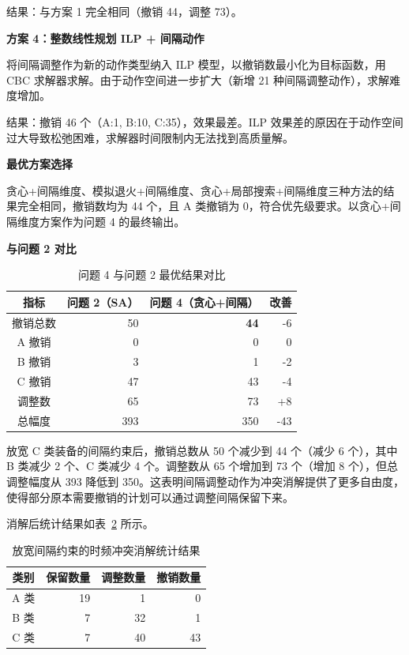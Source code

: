 结果：与方案 1 完全相同（撤销 44，调整 73）。

\textbf{方案 4：整数线性规划 ILP + 间隔动作}

将间隔调整作为新的动作类型纳入 ILP 模型，以撤销数最小化为目标函数，用 CBC 求解器求解。由于动作空间进一步扩大（新增 21 种间隔调整动作），求解难度增加。

结果：撤销 46 个（A:1, B:10, C:35），效果最差。ILP 效果差的原因在于动作空间过大导致松弛困难，求解器时间限制内无法找到高质量解。

\textbf{最优方案选择}

贪心+间隔维度、模拟退火+间隔维度、贪心+局部搜索+间隔维度三种方法的结果完全相同，撤销数均为 44 个，且 A 类撤销为 0，符合优先级要求。以贪心+间隔维度方案作为问题 4 的最终输出。

\textbf{与问题 2 对比}

\begin{table}[htbp]
\centering
\caption{问题 4 与问题 2 最优结果对比}
\label{tab:q4_vs_q2}
\begin{tabular}{crrr}
\toprule
指标 & 问题 2（SA） & 问题 4（贪心+间隔） & 改善 \\
\midrule
撤销总数 & 50 & \textbf{44} & -6 \\
A 撤销 & 0 & 0 & 0 \\
B 撤销 & 3 & 1 & -2 \\
C 撤销 & 47 & 43 & -4 \\
调整数 & 65 & 73 & +8 \\
总幅度 & 393 & 350 & -43 \\
\bottomrule
\end{tabular}
\end{table}

放宽 C 类装备的间隔约束后，撤销总数从 50 个减少到 44 个（减少 6 个），其中 B 类减少 2 个、C 类减少 4 个。调整数从 65 个增加到 73 个（增加 8 个），但总调整幅度从 393 降低到 350。这表明间隔调整动作为冲突消解提供了更多自由度，使得部分原本需要撤销的计划可以通过调整间隔保留下来。

消解后统计结果如表~\ref{tab:q4_result} 所示。

\begin{table}[htbp]
\centering
\caption{放宽间隔约束的时频冲突消解统计结果}
\label{tab:q4_result}
\begin{tabular}{crrr}
\toprule
类别 & 保留数量 & 调整数量 & 撤销数量 \\
\midrule
A 类 & 19 & 1 & 0 \\
B 类 & 7 & 32 & 1 \\
C 类 & 7 & 40 & 43 \\
\bottomrule
\end{tabular}
\end{table}
